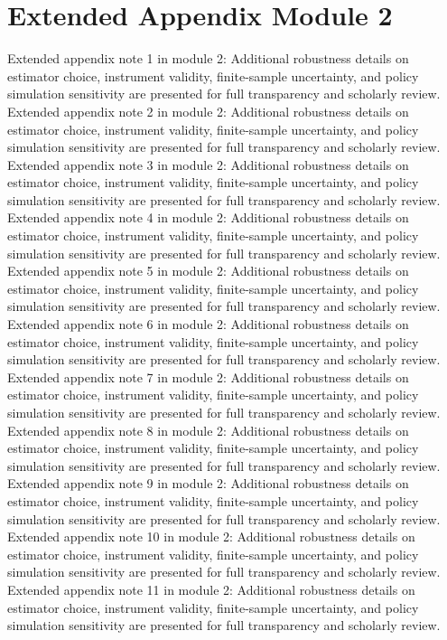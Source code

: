 \documentclass[preprint,12pt]{elsarticle}
\begin{document}
\section{Extended Appendix Module 2}
Extended appendix note 1 in module 2: Additional robustness details on estimator choice, instrument validity, finite-sample uncertainty, and policy simulation sensitivity are presented for full transparency and scholarly review.
Extended appendix note 2 in module 2: Additional robustness details on estimator choice, instrument validity, finite-sample uncertainty, and policy simulation sensitivity are presented for full transparency and scholarly review.
Extended appendix note 3 in module 2: Additional robustness details on estimator choice, instrument validity, finite-sample uncertainty, and policy simulation sensitivity are presented for full transparency and scholarly review.
Extended appendix note 4 in module 2: Additional robustness details on estimator choice, instrument validity, finite-sample uncertainty, and policy simulation sensitivity are presented for full transparency and scholarly review.
Extended appendix note 5 in module 2: Additional robustness details on estimator choice, instrument validity, finite-sample uncertainty, and policy simulation sensitivity are presented for full transparency and scholarly review.
Extended appendix note 6 in module 2: Additional robustness details on estimator choice, instrument validity, finite-sample uncertainty, and policy simulation sensitivity are presented for full transparency and scholarly review.
Extended appendix note 7 in module 2: Additional robustness details on estimator choice, instrument validity, finite-sample uncertainty, and policy simulation sensitivity are presented for full transparency and scholarly review.
Extended appendix note 8 in module 2: Additional robustness details on estimator choice, instrument validity, finite-sample uncertainty, and policy simulation sensitivity are presented for full transparency and scholarly review.
Extended appendix note 9 in module 2: Additional robustness details on estimator choice, instrument validity, finite-sample uncertainty, and policy simulation sensitivity are presented for full transparency and scholarly review.
Extended appendix note 10 in module 2: Additional robustness details on estimator choice, instrument validity, finite-sample uncertainty, and policy simulation sensitivity are presented for full transparency and scholarly review.
Extended appendix note 11 in module 2: Additional robustness details on estimator choice, instrument validity, finite-sample uncertainty, and policy simulation sensitivity are presented for full transparency and scholarly review.
\end{document}
